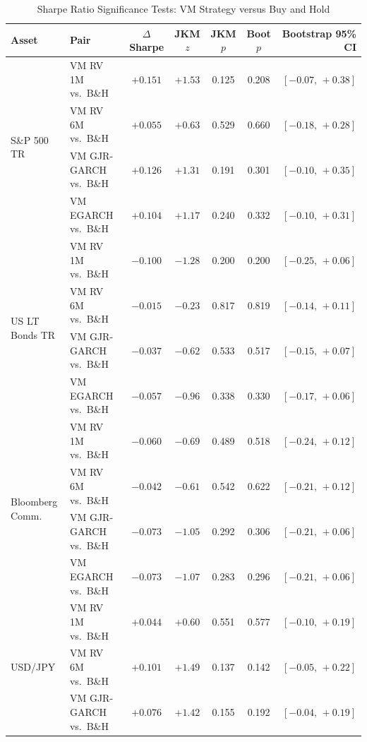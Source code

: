 \documentclass[12pt, a4paper]{article}
\begin{document}
\begin{table}[H]
  \centering
  \caption{Sharpe Ratio Significance Tests: VM Strategy versus Buy and Hold}
  \label{tab:sr_tests}
  \footnotesize
  \begin{tabular}{llccccr}
    \toprule
    \textbf{Asset} & \textbf{Pair}
      & \textbf{$\Delta$ Sharpe} & \textbf{JKM $z$} & \textbf{JKM $p$}
      & \textbf{Boot $p$} & \textbf{Bootstrap 95\% CI} \\
    \midrule
    \multirow{4}{*}{S\&P 500 TR}
      & VM RV 1M vs.\ B\&H        & $+0.151$ & $+1.53$ & 0.125 & 0.208 & $[-0.07,\,+0.38]$ \\
      & VM RV 6M vs.\ B\&H        & $+0.055$ & $+0.63$ & 0.529 & 0.660 & $[-0.18,\,+0.28]$ \\
      & VM GJR-GARCH vs.\ B\&H    & $+0.126$ & $+1.31$ & 0.191 & 0.301 & $[-0.10,\,+0.35]$ \\
      & VM EGARCH vs.\ B\&H       & $+0.104$ & $+1.17$ & 0.240 & 0.332 & $[-0.10,\,+0.31]$ \\
    \midrule
    \multirow{4}{*}{US LT Bonds TR}
      & VM RV 1M vs.\ B\&H        & $-0.100$ & $-1.28$ & 0.200 & 0.200 & $[-0.25,\,+0.06]$ \\
      & VM RV 6M vs.\ B\&H        & $-0.015$ & $-0.23$ & 0.817 & 0.819 & $[-0.14,\,+0.11]$ \\
      & VM GJR-GARCH vs.\ B\&H    & $-0.037$ & $-0.62$ & 0.533 & 0.517 & $[-0.15,\,+0.07]$ \\
      & VM EGARCH vs.\ B\&H       & $-0.057$ & $-0.96$ & 0.338 & 0.330 & $[-0.17,\,+0.06]$ \\
    \midrule
    \multirow{4}{*}{Bloomberg Comm.}
      & VM RV 1M vs.\ B\&H        & $-0.060$ & $-0.69$ & 0.489 & 0.518 & $[-0.24,\,+0.12]$ \\
      & VM RV 6M vs.\ B\&H        & $-0.042$ & $-0.61$ & 0.542 & 0.622 & $[-0.21,\,+0.12]$ \\
      & VM GJR-GARCH vs.\ B\&H    & $-0.073$ & $-1.05$ & 0.292 & 0.306 & $[-0.21,\,+0.06]$ \\
      & VM EGARCH vs.\ B\&H       & $-0.073$ & $-1.07$ & 0.283 & 0.296 & $[-0.21,\,+0.06]$ \\
    \midrule
    \multirow{4}{*}{USD/JPY}
      & VM RV 1M vs.\ B\&H        & $+0.044$ & $+0.60$ & 0.551 & 0.577 & $[-0.10,\,+0.19]$ \\
      & VM RV 6M vs.\ B\&H        & $+0.101$ & $+1.49$ & 0.137 & 0.142 & $[-0.05,\,+0.22]$ \\
      & VM GJR-GARCH vs.\ B\&H    & $+0.076$ & $+1.42$ & 0.155 & 0.192 & $[-0.04,\,+0.19]$ \\

\end{tabular}
\end{table}
\end{document}
